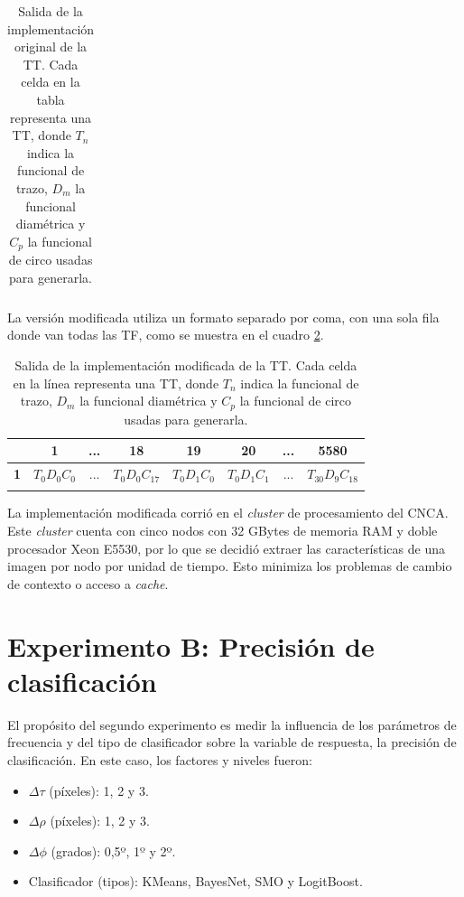 \begin{enumerate}
\begin{longtable}{|c|c|c|c|c|c|}
        \caption{Salida de la implementación original de la TT. Cada celda en la tabla representa una TT, donde $T_n$ indica la funcional de trazo, $D_m$ la funcional diamétrica y $C_p$ la funcional de circo usadas para generarla.}
        \label{tab:salida-tt-rgf}
    \end{longtable}
    
    
    La versión modificada utiliza un formato separado por coma, con una sola fila donde van todas las TF, como se muestra en el cuadro \ref{tab:salida-tt-rrb}.
    
    
    \begin{longtable}{|c|c|c|c|c|c|c|c|}
            \hline 
            \hfill & \textbf{1} & \textbf{...} & \textbf{18} & \textbf{19} & \textbf{20} & \textbf{...} & \textbf{5580} \\ 
            \hline
            \endhead
             \textbf{1} & $T_{0}D_{0}C_{0}$ & ... & $T_{0}D_{0}C_{17}$ & $T_{0}D_{1}C_{0}$ & $T_{0}D_{1}C_{1}$ & ... & $T_{30}D_{9}C_{18}$ \\ \hline

        \caption{Salida de la implementación modificada de la TT. Cada celda en la línea representa una TT, donde $T_n$ indica la funcional de trazo, $D_m$ la funcional diamétrica y $C_p$ la funcional de circo usadas para generarla.}
        \label{tab:salida-tt-rrb}
    \end{longtable}
    
    
    La implementación modificada corrió en el \emph{cluster} de procesamiento del CNCA. Este \emph{cluster} cuenta con cinco nodos con 32 GBytes de memoria RAM y doble procesador Xeon E5530, por lo que se decidió extraer las características de una imagen por nodo por unidad de tiempo. Esto minimiza los problemas de cambio de contexto o acceso a \emph{cache}.
    
\end{enumerate}

\section{Experimento B: Precisión de clasificación}
\label{subsect:experiment B}

El propósito del segundo experimento es medir la influencia de los parámetros de frecuencia y del tipo de clasificador sobre la variable de respuesta, la precisión de clasificación. En este caso, los factores y niveles fueron:

\begin{itemize}
    \item $\Delta \tau$ (píxeles): 1, 2 y 3.
    \item $\Delta \rho$ (píxeles): 1, 2 y 3.
    \item $\Delta \phi$ (grados): 0,5º, 1º y 2º.
    \item Clasificador (tipos): KMeans, BayesNet, SMO y LogitBoost.
\end{itemize}

